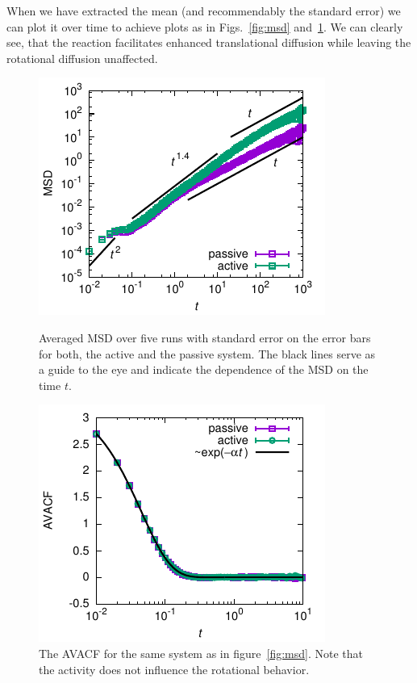 \documentclass[aip,jcp,reprint,a4paper,onecolumn,nofootinbib,amsmath,amssymb]{revtex4-1}
\begin{document}
When we have extracted the mean (and recommendably the standard error) we can plot it over time to achieve plots as in Figs.~\ref{fig:msd} and~\ref{fig:avacf}. We can clearly see, that the reaction facilitates enhanced translational diffusion while
leaving the rotational diffusion unaffected.

\begin{figure}[tb]
  \centering
  \leavevmode\hfill
  \begin{minipage}[t]{.45\linewidth}
    \centering
    \includegraphics{FIGURES/msd}
    \caption{Averaged MSD over five runs with standard error on the
      error bars for both, the active and the passive system. The
      black lines serve as a guide to the eye and indicate the
      dependence of the MSD on the time $t$.}
    \label{fig:msd}
  \end{minipage}
  \hfill
  \begin{minipage}[t]{.45\linewidth}
    \centering
    \includegraphics{FIGURES/avacf}
    \caption{The AVACF for the same system as in
      figure~\ref{fig:msd}. Note that the activity does not influence
      the rotational behavior.}
    \label{fig:avacf}
  \end{minipage}
  \hfill\null
\end{figure}
\end{document}

